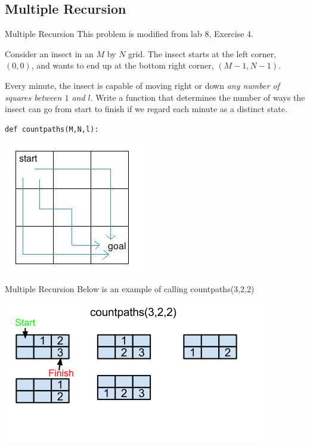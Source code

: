 \documentclass[9pt]{beamer}
\begin{document}
\subsection{Multiple Recursion}
\begin{frame}[fragile]{Multiple Recursion}
  This problem is modified from lab 8, Exercise 4.

  Consider an insect in an $M$ by $N$ grid. The insect starts at the left
  corner, $(0,0)$, and wants to end up at the bottom right corner,
  $(M-1,N-1)$.

  Every minute, the insect is capable of moving right or down \emph{any
  number of squares between $1$ and $l$}. Write a function that determines
  the number of ways the insect can go from start to finish if we regard
  each minute as a distinct state.

  \begin{lstlisting}
def countpaths(M,N,l):
  \end{lstlisting}

  \includegraphics[scale=0.5]{insect.jpeg}
\end{frame}

\begin{frame}[fragile]{Multiple Recursion}
  Below is an example of calling countpaths(3,2,2)

  \includegraphics[scale=0.5]{countpaths.png}
\end{frame}
\end{document}
